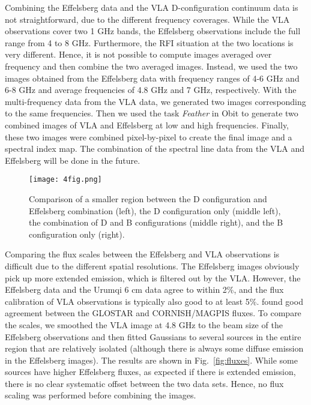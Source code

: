 \documentclass{aa}
\begin{document}
Combining the Effelsberg data and the VLA D-configuration continuum data is not straightforward, due to the different frequency coverages. While the VLA observations cover two 1 GHz bands, the Effelsberg observations include the full range from 4 to 8 GHz. Furthermore, the RFI situation at the two locations is very different. Hence, it is not possible to compute images averaged over frequency and then combine the two averaged images. Instead, we used the two images obtained from the Effelsberg data with frequency ranges of 4-6 GHz and 6-8 GHz and average frequencies of 4.8 GHz and 7 GHz, respectively. With the multi-frequency data from the VLA data, we generated two images corresponding to the same frequencies. Then we used the task {\it Feather} in Obit \citep{Cotton2017} to generate two combined images of VLA and Effelsberg at   low and high frequencies. Finally, these two images were combined pixel-by-pixel to create the final image and a spectral index map. The combination of the spectral line data from the VLA and Effelsberg will be done in the future.

\begin{figure*}
\texttt{[image: 4fig.png]}
\caption{Comparison of a smaller region between the D configuration and Effelsberg combination (left), the D configuration only  (middle left), the combination of D and B configurations (middle right), and the B configuration only  (right).}
\label{fig:all_conf}
\end{figure*}

Comparing the flux scales between the Effelsberg and VLA observations is difficult due to the different spatial resolutions.  The Effelsberg images obviously pick up more extended emission, which is filtered out by the VLA. However, the Effelsberg data and the Urumqi 6 cm data agree to within 2\%, and the flux calibration of VLA observations is typically also good to at least 5\%. \cite{Medina2019} found  good agreement between the  GLOSTAR and CORNISH/MAGPIS fluxes. To compare the scales, we smoothed the VLA image at 4.8 GHz to the beam size of the Effelsberg observations and then fitted Gaussians to several sources in the entire region that are relatively isolated (although there is always some diffuse emission in the Effelsberg images). The results are shown in Fig.~\ref{fig:fluxes}. While some sources have higher Effelsberg fluxes, as expected if there is extended emission, there is no clear systematic offset between the two data sets. Hence, no flux scaling was performed before combining the images.
\end{document}
